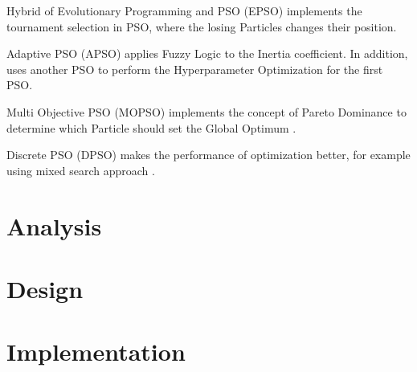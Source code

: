 Hybrid of Evolutionary Programming and PSO (EPSO) implements the tournament selection in PSO, where the losing Particles changes their position.

Adaptive PSO (APSO) applies Fuzzy Logic to the Inertia coefficient. In addition, uses another PSO to perform the Hyperparameter Optimization for the first PSO.

Multi Objective PSO (MOPSO) implements the concept of Pareto Dominance to determine which Particle should set the Global Optimum \cite{Tesi-3.5}.

Discrete PSO (DPSO) makes the performance of optimization better, for example using mixed search approach \cite{Tesi-3.5}.




\section{Analysis}

\lipsum  %

\section{Design}

\lipsum  %

\section{Implementation}

\lipsum  %
